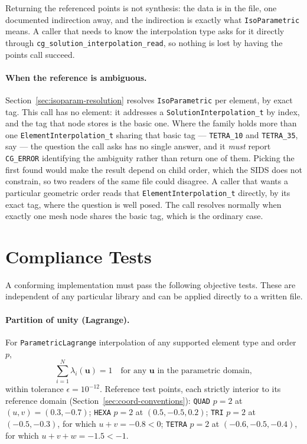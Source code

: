 \documentclass[11pt,letterpaper]{article}
\newif\ifvfourdraft
\newenvironment{v4block}{\ifvfourdraft\color{v4violet}\fi\ignorespaces}{\par}
\newcommand{\vfourmark}{\ifvfourdraft\textcolor{v4violet}{\textbf{[v4]}}\ \fi}
\begin{document}
Returning the referenced points is not synthesis: the data is in the file, one documented
indirection away, and the indirection is exactly what \texttt{IsoParametric} means.  A caller
that needs to know the interpolation type asks for it directly through
\texttt{cg\_solution\_interpolation\_read}, so nothing is lost by having the points call
succeed.

\begin{v4block}
\paragraph{\vfourmark When the reference is ambiguous.}
Section~\ref{sec:isoparam-resolution} resolves \texttt{IsoParametric} per element,
by exact tag.  This call has no element: it addresses a
\texttt{SolutionInterpolation\_t} by index, and the tag that node stores is the
basic one.  Where the family holds more than one \texttt{ElementInterpolation\_t}
sharing that basic tag --- \texttt{TETRA\_10} and \texttt{TETRA\_35}, say --- the
question the call asks has no single answer, and it \emph{must} report
\texttt{CG\_ERROR} identifying the ambiguity rather than return one of them.
Picking the first found would make the result depend on child order, which the
SIDS does not constrain, so two readers of the same file could disagree.  A
caller that wants a particular geometric order reads that
\texttt{ElementInterpolation\_t} directly, by its exact tag, where the question is
well posed.  The call resolves normally when exactly one mesh node shares the
basic tag, which is the ordinary case.
\end{v4block}


\section{Compliance Tests}
\label{sec:compliance}

A conforming implementation must pass the following objective tests.  These are independent
of any particular library and can be applied directly to a written file.

\paragraph{Partition of unity (Lagrange).}
For \texttt{ParametricLagrange} interpolation of any supported element type and order $p$,
\begin{equation}
  \sum_{i=1}^{N} \lambda_i(\mathbf{u}) = 1
  \quad \text{for any } \mathbf{u} \text{ in the parametric domain},
\end{equation}
within tolerance $\epsilon = 10^{-12}$.  Reference test points, each strictly interior to
its reference domain (Section~\ref{sec:coord-conventions}): \texttt{QUAD} $p=2$ at
$(u,v)=(0.3, -0.7)$; \texttt{HEXA} $p=2$ at $(0.5, -0.5, 0.2)$; \texttt{TRI} $p=2$ at
$(-0.5, -0.3)$, for which $u+v = -0.8 < 0$; \texttt{TETRA} $p=2$ at $(-0.6, -0.5, -0.4)$,
for which $u+v+w = -1.5 < -1$.
\end{document}
